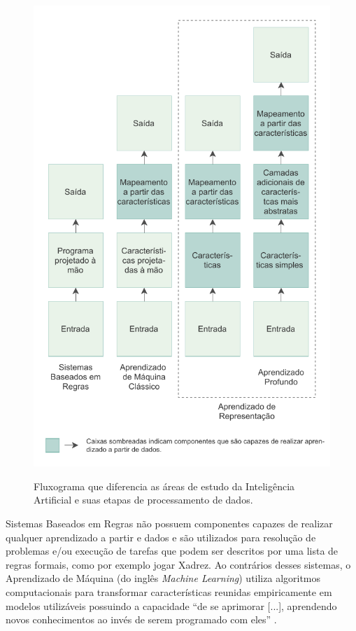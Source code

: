 \begin{figure}[h!] %
  \centering
  \caption{Fluxograma que diferencia as áreas de estudo da Inteligência Artificial e suas etapas de processamento de dados. }
  \includegraphics[scale=1.1]{img/img-fundamentacao-fluxograma.pdf}
  \label{fig:fund-fluxograma}
\end{figure}

Sistemas Baseados em Regras não possuem componentes capazes de realizar qualquer aprendizado a partir e dados \cite{ref:Goodfellow-Bengio-Courville} e são utilizados para resolução de problemas e/ou execução de tarefas que podem ser descritos por uma lista de regras formais, como por exemplo jogar Xadrez. Ao contrários desses sistemas, o Aprendizado de Máquina (do inglês \textit{Machine Learning}) utiliza algoritmos computacionais para transformar características reunidas empiricamente em modelos utilizáveis \cite{ref:Edgar-Manz} possuindo a capacidade ``de se aprimorar [...], aprendendo novos conhecimentos ao invés de serem programado com eles'' \cite{ref:Woolf}.

